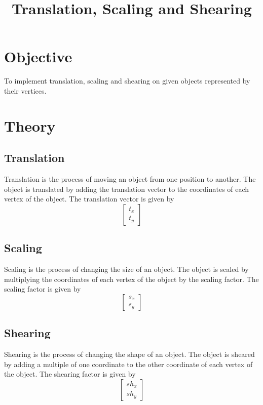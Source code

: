 \documentclass[12pt]{article}
\title{Translation, Scaling and Shearing}
\date{}
\author{}
\begin{document}
	\maketitle
	\vspace{-2cm}

	\section{Objective}
	To implement translation, scaling and shearing on given objects represented by their vertices.
	\section{Theory}
	\subsection{Translation}
	Translation is the process of moving an object from one position to another. The object is translated by adding the translation vector to the coordinates of each vertex of the object. The translation vector is given by
	\begin{equation*}
		\begin{bmatrix}
			t_x\\
			t_y
		\end{bmatrix}
	\end{equation*}
	\subsection{Scaling}
	Scaling is the process of changing the size of an object. The object is scaled by multiplying the coordinates of each vertex of the object by the scaling factor. The scaling factor is given by
	\begin{equation*}
		\begin{bmatrix}
			s_x\\
			s_y
		\end{bmatrix}
	\end{equation*}
	\subsection{Shearing}
	Shearing is the process of changing the shape of an object. The object is sheared by adding a multiple of one coordinate to the other coordinate of each vertex of the object. The shearing factor is given by
	\begin{equation*}
		\begin{bmatrix}
			sh_x\\
			sh_y
		\end{bmatrix}
	\end{equation*}
\end{document}
